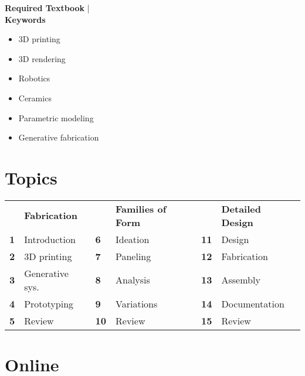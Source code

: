 \documentclass[11pt,article,oneside]{memoir}
\begin{document}
\noindent\textbf{Required Textbook} |
\\

\noindent\textbf{Keywords}
\begin{multicols}{3}
\raggedright
\small
\begin{itemize}
\item 3D printing
\item 3D rendering
\item Robotics
\item Ceramics
\item Parametric modeling
\item Generative fabrication
\end{itemize}
\end{multicols}

\section{Topics}

\vspace*{-1em}
%
\begin{table}[H]
\begin{tabular}{l l @{\hskip 0.5cm} l l @{\hskip 0.5cm} l l}
 & \textbf{Fabrication} & & \textbf{Families of Form} && \textbf{Detailed Design}\\
\small
\textbf{1} & Introduction & \textbf{6} & Ideation & \textbf{11} & Design\\
\textbf{2} & 3D printing & \textbf{7} & Paneling & \textbf{12} & Fabrication\\
\textbf{3} & Generative sys. & \textbf{8} & Analysis & \textbf{13} & Assembly\\
\textbf{4} & Prototyping & \textbf{9} & Variations & \textbf{14} & Documentation\\
\textbf{5} & Review & \textbf{10} & Review & \textbf{15} & Review\\
\end{tabular}
\end{table}

\clearpage

\section{Online}
\end{document}
